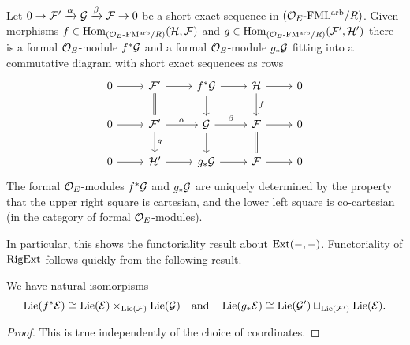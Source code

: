 \documentclass[../main.tex]{subfiles}
\begin{document}
\begin{lem}\label{lem:CartesianSquare}
Let $0 \to \mathcal{F}' \xrightarrow{\alpha} \mathcal{G} \xrightarrow{\beta} \mathcal{F} \to 0$ be a short exact sequence in 
  ${({\mathcal{O}_E}\textnormal-\allowbreak\mathrm{FML^{arb}}/{R})}$. 
  Given morphisms $f \in \operatorname{Hom}_{{({\mathcal{O}_E}\textnormal-\allowbreak\mathrm{FM^{arb}}/{R})}}(\mathcal{H} , \mathcal{F})$ 
  and $g \in \operatorname{Hom}_{{({\mathcal{O}_E}\textnormal-\allowbreak\mathrm{FM^{arb}}/{R})}}(\mathcal{F}', \mathcal{H}')$ there is a formal
  ${\mathcal{O}_E}$-module $f^*\mathcal{G}$ and a formal $\mathcal{O}_E$-module $g_*\mathcal{G}$ fitting into a
  commutative diagram with short exact sequences as rows
  \begin{equation*}
    \begin{tikzcd}[ampersand replacement=\&]
    	0 \& {\cF'} \& {f^* \cG} \& \cH \& 0 \\
    	0 \& {\cF'} \& \cG \& \cF \& 0 \\
    	0 \& {\cH'} \& {g_*\cG} \& \cF \& 0
    	\arrow[from=1-1, to=1-2]
    	\arrow[from=1-2, to=1-3]
    	\arrow[Rightarrow, no head, from=1-2, to=2-2]
    	\arrow[from=1-3, to=1-4]
    	\arrow[from=1-3, to=2-3]
    	\arrow[from=1-4, to=1-5]
    	\arrow["f", from=1-4, to=2-4]
    	\arrow[from=2-1, to=2-2]
    	\arrow["\alpha", from=2-2, to=2-3]
    	\arrow["g", from=2-2, to=3-2]
    	\arrow["\beta", from=2-3, to=2-4]
    	\arrow[from=2-3, to=3-3]
    	\arrow[from=2-4, to=2-5]
    	\arrow[Rightarrow, no head, from=2-4, to=3-4]
    	\arrow[from=3-1, to=3-2]
    	\arrow[from=3-2, to=3-3]
    	\arrow[from=3-3, to=3-4]
    	\arrow[from=3-4, to=3-5]
    \end{tikzcd}
  \end{equation*}
  The formal $\mathcal{O}_E$-modules $f^* \mathcal{G}$ and $g_* \mathcal{G}$ are uniquely determined by the
  property that the upper right square is cartesian, and the lower left square is
  co-cartesian (in the category of formal $\mathcal{O}_E$-modules).
\end{lem}

In particular, this shows the functoriality result about $\operatorname{Ext}(-,-)$. 
Functoriality of $\operatorname {RigExt}$ follows quickly from the following result. 
\begin{lem}\label{lem:LieAlgebrasOfPBandPFW}
  We have natural isomorpisms 
  \begin{equation*}
    \operatorname{Lie}(f^* \mathcal{E}) \cong \operatorname{Lie}(\mathcal{E}) \times_{\operatorname{Lie}(\mathcal{F})} \operatorname{Lie}(\mathcal{G}) \quad \text{and}
    \quad \operatorname{Lie}(g_* \mathcal{E}) \cong \operatorname{Lie}(\mathcal{G}') \sqcup_{\operatorname{Lie}(\mathcal{F}')} \operatorname{Lie}(\mathcal{E}).
  \end{equation*}
\begin{proof}
  This is true independently of the choice of coordinates.
\end{proof}
\end{lem}
\end{document}
